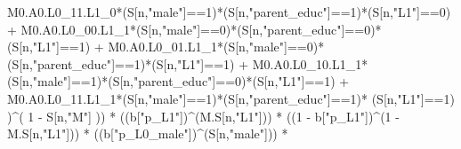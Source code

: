 \documentclass[
]{book}
\newenvironment{Shaded}{\begin{snugshade}}{\end{snugshade}}
\newcommand{\DecValTok}[1]{\textcolor[rgb]{0.00,0.00,0.81}{#1}}
\newcommand{\NormalTok}[1]{#1}
\newcommand{\SpecialCharTok}[1]{\textcolor[rgb]{0.00,0.00,0.00}{#1}}
\newcommand{\StringTok}[1]{\textcolor[rgb]{0.31,0.60,0.02}{#1}}
\begin{document}
\begin{Shaded}
\begin{Highlighting}[]
\NormalTok{          M0.A0.L0\_11.L1\_0}\SpecialCharTok{*}\NormalTok{(S[n,}\StringTok{"male"}\NormalTok{]}\SpecialCharTok{==}\DecValTok{1}\NormalTok{)}\SpecialCharTok{*}\NormalTok{(S[n,}\StringTok{"parent\_educ"}\NormalTok{]}\SpecialCharTok{==}\DecValTok{1}\NormalTok{)}\SpecialCharTok{*}\NormalTok{(S[n,}\StringTok{"L1"}\NormalTok{]}\SpecialCharTok{==}\DecValTok{0}\NormalTok{) }\SpecialCharTok{+}
\NormalTok{          M0.A0.L0\_00.L1\_1}\SpecialCharTok{*}\NormalTok{(S[n,}\StringTok{"male"}\NormalTok{]}\SpecialCharTok{==}\DecValTok{0}\NormalTok{)}\SpecialCharTok{*}\NormalTok{(S[n,}\StringTok{"parent\_educ"}\NormalTok{]}\SpecialCharTok{==}\DecValTok{0}\NormalTok{)}\SpecialCharTok{*}\NormalTok{(S[n,}\StringTok{"L1"}\NormalTok{]}\SpecialCharTok{==}\DecValTok{1}\NormalTok{) }\SpecialCharTok{+}
\NormalTok{          M0.A0.L0\_01.L1\_1}\SpecialCharTok{*}\NormalTok{(S[n,}\StringTok{"male"}\NormalTok{]}\SpecialCharTok{==}\DecValTok{0}\NormalTok{)}\SpecialCharTok{*}\NormalTok{(S[n,}\StringTok{"parent\_educ"}\NormalTok{]}\SpecialCharTok{==}\DecValTok{1}\NormalTok{)}\SpecialCharTok{*}\NormalTok{(S[n,}\StringTok{"L1"}\NormalTok{]}\SpecialCharTok{==}\DecValTok{1}\NormalTok{) }\SpecialCharTok{+}
\NormalTok{          M0.A0.L0\_10.L1\_1}\SpecialCharTok{*}\NormalTok{(S[n,}\StringTok{"male"}\NormalTok{]}\SpecialCharTok{==}\DecValTok{1}\NormalTok{)}\SpecialCharTok{*}\NormalTok{(S[n,}\StringTok{"parent\_educ"}\NormalTok{]}\SpecialCharTok{==}\DecValTok{0}\NormalTok{)}\SpecialCharTok{*}\NormalTok{(S[n,}\StringTok{"L1"}\NormalTok{]}\SpecialCharTok{==}\DecValTok{1}\NormalTok{) }\SpecialCharTok{+}
\NormalTok{          M0.A0.L0\_11.L1\_1}\SpecialCharTok{*}\NormalTok{(S[n,}\StringTok{"male"}\NormalTok{]}\SpecialCharTok{==}\DecValTok{1}\NormalTok{)}\SpecialCharTok{*}\NormalTok{(S[n,}\StringTok{"parent\_educ"}\NormalTok{]}\SpecialCharTok{==}\DecValTok{1}\NormalTok{)}\SpecialCharTok{*}
\NormalTok{          (S[n,}\StringTok{"L1"}\NormalTok{]}\SpecialCharTok{==}\DecValTok{1}\NormalTok{) )}\SpecialCharTok{\^{}}\NormalTok{( }\DecValTok{1} \SpecialCharTok{{-}}\NormalTok{ S[n,}\StringTok{"M"}\NormalTok{] )) }\SpecialCharTok{*}
\NormalTok{      ((b[}\StringTok{"p\_L1"}\NormalTok{])}\SpecialCharTok{\^{}}\NormalTok{(M.S[n,}\StringTok{"L1"}\NormalTok{])) }\SpecialCharTok{*}
\NormalTok{      ((}\DecValTok{1} \SpecialCharTok{{-}}\NormalTok{ b[}\StringTok{"p\_L1"}\NormalTok{])}\SpecialCharTok{\^{}}\NormalTok{(}\DecValTok{1} \SpecialCharTok{{-}}\NormalTok{ M.S[n,}\StringTok{"L1"}\NormalTok{])) }\SpecialCharTok{*}
\NormalTok{      ((b[}\StringTok{"p\_L0\_male"}\NormalTok{])}\SpecialCharTok{\^{}}\NormalTok{(S[n,}\StringTok{"male"}\NormalTok{])) }\SpecialCharTok{*} 

\end{Highlighting}
\end{Shaded}
\end{document}
